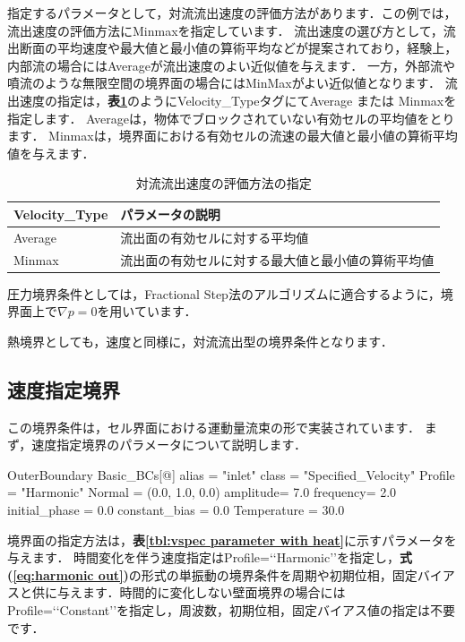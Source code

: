 \noindent 指定するパラメータとして，対流流出速度の評価方法があります．この例では，流出速度の評価方法にMinmaxを指定しています．
流出速度の選び方として，流出断面の平均速度や最大値と最小値の算術平均などが提案されており，経験上，内部流の場合にはAverageが流出速度のよい近似値を与えます．
一方，外部流や噴流のような無限空間の境界面の場合にはMinMaxがよい近似値となります．
流出速度の指定は，\textbf{表\ref{tbl:outflow velocity}}のようにVelocity\_TypeタグにてAverage または Minmaxを指定します．
Averageは，物体でブロックされていない有効セルの平均値をとります．
Minmaxは，境界面における有効セルの流速の最大値と最小値の算術平均値を与えます．

\begin{table}[htdp]
\caption{対流流出速度の評価方法の指定}
\begin{center}
\small
\begin{tabular}{ll} \toprule
Velocity\_Type & パラメータの説明\\ \midrule
Average & 流出面の有効セルに対する平均値\\
Minmax & 流出面の有効セルに対する最大値と最小値の算術平均値\\ \bottomrule
\end{tabular}
\end{center}
\label{tbl:outflow velocity}
\end{table}

圧力境界条件としては，Fractional Step法のアルゴリズムに適合するように，境界面上で$\nabla p=0$を用いています．

熱境界としても，速度と同様に，対流流出型の境界条件となります．



\pagebreak
\subsection{速度指定境界}

この境界条件は，セル界面における運動量流束の形で実装されています．
まず，速度指定境界のパラメータについて説明します．

{\small
\begin{program}
OuterBoundary {
  Basic_BCs[@] {
    alias    = "inlet"
    class    = "Specified_Velocity"
    Profile  = "Harmonic"
    Normal   = (0.0, 1.0, 0.0)
    amplitude= 7.0
    frequency= 2.0
    initial_phase = 0.0
    constant_bias = 0.0
    Temperature = 30.0
  }
}
\end{program}
}

\noindent 境界面の指定方法は，\textbf{表\ref{tbl:vspec parameter with heat}}に示すパラメータを与えます．
時間変化を伴う速度指定はProfile=\lq\lq Harmonic\rq\rq を指定し，\textbf{式(\ref{eq:harmonic out})}の形式の単振動の境界条件を周期や初期位相，固定バイアスと供に与えます．時間的に変化しない壁面境界の場合にはProfile=\lq\lq Constant\rq\rq を指定し，周波数，初期位相，固定バイアス値の指定は不要です．

